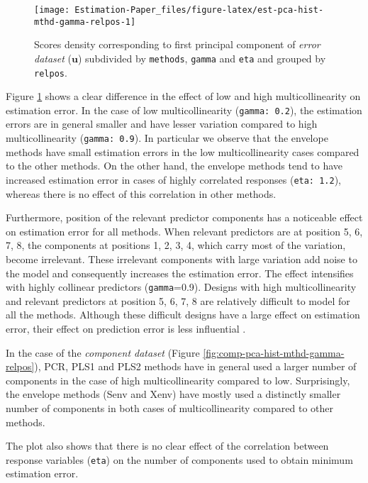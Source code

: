 \documentclass[12pt,3p,authoryear]{elsarticle}
\begin{document}
\begin{figure}[!htb]
\texttt{[image: Estimation-Paper\_files/figure-latex/est-pca-hist-mthd-gamma-relpos-1]} \caption{Scores density corresponding to first principal component
of \emph{error dataset} (\(\mathbf{u}\)) subdivided by \texttt{methods},
\texttt{gamma} and \texttt{eta} and grouped by \texttt{relpos}.}\label{fig:est-pca-hist-mthd-gamma-relpos}
\end{figure}

Figure \ref{fig:est-pca-hist-mthd-gamma-relpos} shows a clear difference
in the effect of low and high multicollinearity on estimation error. In
the case of low multicollinearity (\texttt{gamma:\ 0.2}), the estimation
errors are in general smaller and have lesser variation compared to high
multicollinearity (\texttt{gamma:\ 0.9}). In particular we observe that
the envelope methods have small estimation errors in the low
multicollinearity cases compared to the other methods. On the other
hand, the envelope methods tend to have increased estimation error in
cases of highly correlated responses (\texttt{eta:\ 1.2}), whereas there
is no effect of this correlation in other methods.

Furthermore, position of the relevant predictor components has a
noticeable effect on estimation error for all methods. When relevant
predictors are at position 5, 6, 7, 8, the components at positions 1, 2,
3, 4, which carry most of the variation, become irrelevant. These
irrelevant components with large variation add noise to the model and
consequently increases the estimation error. The effect intensifies with
highly collinear predictors (\texttt{gamma}=0.9). Designs with high
multicollinearity and relevant predictors at position 5, 6, 7, 8 are
relatively difficult to model for all the methods. Although these
difficult designs have a large effect on estimation error, their effect
on prediction error is less influential \citep{rimal2019pred}.






In the case of the \emph{component dataset} (Figure
\ref{fig:comp-pca-hist-mthd-gamma-relpos}), PCR, PLS1 and PLS2 methods
have in general used a larger number of components in the case of high
multicollinearity compared to low. Surprisingly, the envelope methods
(Senv and Xenv) have mostly used a distinctly smaller number of
components in both cases of multicollinearity compared to other methods.

The plot also shows that there is no clear effect of the correlation
between response variables (\texttt{eta}) on the number of components
used to obtain minimum estimation error.
\end{document}
